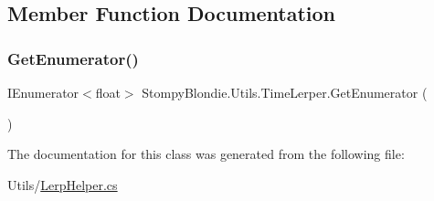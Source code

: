 \subsection{Member Function Documentation}
\mbox{\label{class_stompy_blondie_1_1_utils_1_1_time_lerper_a94f254b4f590804aaa2acbb2f6fb51c9}} 
\subsubsection{\texorpdfstring{Get\+Enumerator()}{GetEnumerator()}}
{\footnotesize\ttfamily I\+Enumerator$<$float$>$ Stompy\+Blondie.\+Utils.\+Time\+Lerper.\+Get\+Enumerator (\begin{DoxyParamCaption}{ }\end{DoxyParamCaption})\hspace{0.3cm}{\ttfamily [inline]}}



The documentation for this class was generated from the following file\+:\begin{DoxyCompactItemize}
\item 
Utils/\mbox{\hyperlink{_lerp_helper_8cs}{Lerp\+Helper.\+cs}}\end{DoxyCompactItemize}
